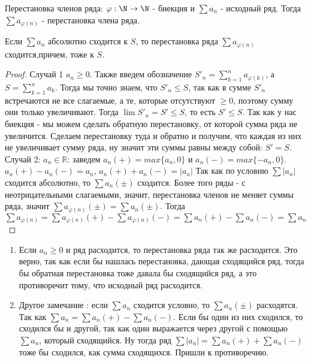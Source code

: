 

\begin{definition} \thmslashn 

Перестановка членов ряда: $\varphi: \N \to \N$ - биекция и $\sum a_n$ - исходный ряд. Тогда $\sum a_{\varphi(n)}$ - перестановка члена ряда.\\
\end{definition}

\begin{theorem}\thmslashn

Если $\sum a_n$ абсолютно сходится к $S$, то перестановка ряда $\sum a_{\varphi(n)} $ сходится,причем, тоже к $S$.
\end{theorem}

\begin{proof}\thmslashn

 Случай 1 $a_n \ge 0$. Также введем обозначение $S'_n =\sum_{k=1}^n a_{\varphi(k)} $, а $S = \sum_ {k=1}^n a_k$. Тогда мы точно знаем, что $S'_n \leq S$, так как в сумме $S'_n$ встречаются не все слагаемые, а те, которые отсутствуют $\ge 0$, поэтому сумму они только увеличивают. Тогда $\lim S'_n = S' \leq S$, то есть $S' \le S$. Так как у нас биекция - мы можем сделать обратную перестановку, от которой сумма ряда не увеличится. Сделаем перестановку туда и обратно и получим, что каждая из них не увеличивает сумму ряда, ну значит эти суммы равны между собой: $S'=S$. \\
Случай 2: $a_n \in \mathbb{R}$: заведем $a_n(+) = max \{a_n,0\}$ и $a_n(-)=max \{-a_n,0\}$. $a_n(+)-a_n(-)=a_n$, $a_n(+)+a_n(-)=|a_n|$
Так как по условию $\sum |a_n|$ сходится абсолютно, то $\sum a_n(\pm)$ сходится. Более того ряды - с неотрицательными слагаемыми, значит, перестановка членов не меняет суммы ряда, значит $\sum a_{\varphi(n)}(\pm) = \sum a_n(\pm)$. Тогда $\sum a_{\varphi(n)} = \sum a_{\varphi(n)}(+)-\sum a_{\varphi(n)}(-)=\sum a_n (+) - \sum a_n(-)= \sum a_n$\\
\end{proof}

\begin{remark}\thmslashn

	\begin{enumerate}

		\item Если $a_n \ge 0$ и ряд расходится, то перестановка ряда так же расходится. Это верно, так как если бы нашлась перестановка, дающая сходящийся ряд, тогда бы обратная перестановка тоже давала бы сходящийся ряд, а это противоречит тому, что исходный ряд расходится.\\
		\item Другое замечание : если $\sum a_n$ сходится условно, то $\sum a_n(\pm)$ расходятся. Так как $\sum a_n = \sum a_n (+) - \sum a_n(-)$. Если бы один из них сходился, то сходился бы и другой, так как один выражается через другой с помощью $\sum a_n$, который сходящийся. Ну тогда ряд $\sum |a_n| = \sum a_n (+) + \sum a_n(-)$ тоже бы сходился, как сумма сходящихся. Пришли к противоречию.
	\end{enumerate}
\end{remark}
